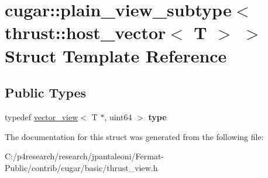 \hypertarget{structcugar_1_1plain__view__subtype_3_01thrust_1_1host__vector_3_01_t_01_4_01_4}{}\section{cugar\+:\+:plain\+\_\+view\+\_\+subtype$<$ thrust\+:\+:host\+\_\+vector$<$ T $>$ $>$ Struct Template Reference}
\label{structcugar_1_1plain__view__subtype_3_01thrust_1_1host__vector_3_01_t_01_4_01_4}
\subsection*{Public Types}
\begin{DoxyCompactItemize}
\item 
\mbox{\label{structcugar_1_1plain__view__subtype_3_01thrust_1_1host__vector_3_01_t_01_4_01_4_adf43f51b6a2920422a5ccf046182ced8}} 
typedef \hyperlink{structcugar_1_1vector__view}{vector\+\_\+view}$<$ T $\ast$, uint64 $>$ {\bfseries type}
\end{DoxyCompactItemize}


The documentation for this struct was generated from the following file\+:\begin{DoxyCompactItemize}
\item 
C\+:/p4research/research/jpantaleoni/\+Fermat-\/\+Public/contrib/cugar/basic/thrust\+\_\+view.\+h\end{DoxyCompactItemize}
